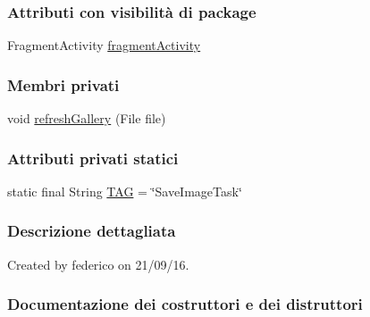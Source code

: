 \subsubsection*{Attributi con visibilità di package}
\begin{DoxyCompactItemize}
\item 
Fragment\+Activity \hyperlink{classit_1_1unibo_1_1torsello_1_1bluetoothpositioning_1_1examplesCamera_1_1SaveImageTask_a020c67ae36b7f908c900da193d9cd110_a020c67ae36b7f908c900da193d9cd110}{fragment\+Activity}
\end{DoxyCompactItemize}
\subsubsection*{Membri privati}
\begin{DoxyCompactItemize}
\item 
void \hyperlink{classit_1_1unibo_1_1torsello_1_1bluetoothpositioning_1_1examplesCamera_1_1SaveImageTask_a8bcd9bba7269b952dd0a06bdc3381c25_a8bcd9bba7269b952dd0a06bdc3381c25}{refresh\+Gallery} (File file)
\end{DoxyCompactItemize}
\subsubsection*{Attributi privati statici}
\begin{DoxyCompactItemize}
\item 
static final String \hyperlink{classit_1_1unibo_1_1torsello_1_1bluetoothpositioning_1_1examplesCamera_1_1SaveImageTask_a908ad84901185def0257ea5288f64c3c_a908ad84901185def0257ea5288f64c3c}{T\+AG} = \char`\"{}Save\+Image\+Task\char`\"{}
\end{DoxyCompactItemize}


\subsubsection{Descrizione dettagliata}
Created by federico on 21/09/16. 

\subsubsection{Documentazione dei costruttori e dei distruttori}
\hypertarget{classit_1_1unibo_1_1torsello_1_1bluetoothpositioning_1_1examplesCamera_1_1SaveImageTask_a8d08d12c0e15cc34f4dbfcefc0931629_a8d08d12c0e15cc34f4dbfcefc0931629}{}\label{classit_1_1unibo_1_1torsello_1_1bluetoothpositioning_1_1examplesCamera_1_1SaveImageTask_a8d08d12c0e15cc34f4dbfcefc0931629_a8d08d12c0e15cc34f4dbfcefc0931629} 
